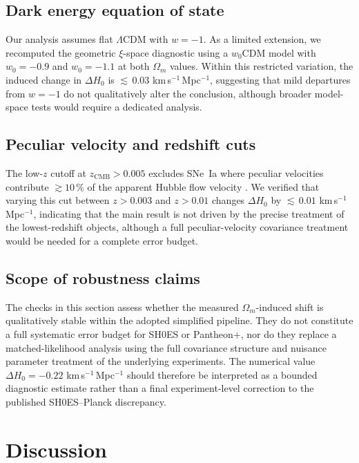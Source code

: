 \documentclass[fleqn,usenatbib,useAMS]{mnras}
\begin{document}
\subsection{Dark energy equation of state}

Our analysis assumes flat $\Lambda$CDM with $w = -1$.
As a limited extension, we recomputed the geometric $\xi$-space
diagnostic using a $w_0$CDM model with $w_0 = -0.9$
and $w_0 = -1.1$ at both $\Omega_m$ values.
Within this restricted variation, the induced change in $\Delta H_0$
is ${\lesssim}\,0.03$ km\,s$^{-1}$\,Mpc$^{-1}$, suggesting that
mild departures from $w = -1$ do not qualitatively alter the
conclusion, although broader model-space tests would require a
dedicated analysis.

\subsection{Peculiar velocity and redshift cuts}

The low-$z$ cutoff at $z_\mathrm{CMB} > 0.005$ excludes SNe~Ia
where peculiar velocities contribute $\gtrsim 10$\,\% of the
apparent Hubble flow velocity \citep{hui2006,peterson2022}.
We verified that varying this cut between $z > 0.003$ and
$z > 0.01$ changes $\Delta H_0$ by ${\lesssim}\,0.01$
km\,s$^{-1}$\,Mpc$^{-1}$, indicating that the main result is not
driven by the precise treatment of the lowest-redshift objects,
although a full peculiar-velocity covariance treatment would be
needed for a complete error budget.

\subsection{Scope of robustness claims}

The checks in this section assess whether the measured
$\Omega_m$-induced shift is qualitatively stable within the adopted
simplified pipeline.
They do not constitute a full systematic error budget for SH0ES or
Pantheon+, nor do they replace a matched-likelihood analysis using
the full covariance structure and nuisance parameter treatment of
the underlying experiments.
The numerical value $\Delta H_0 = -0.22$ km\,s$^{-1}$\,Mpc$^{-1}$
should therefore be interpreted as a bounded diagnostic estimate
rather than a final experiment-level correction to the published
SH0ES--Planck discrepancy.

\section{Discussion}
\label{sec:discuss}
\end{document}

